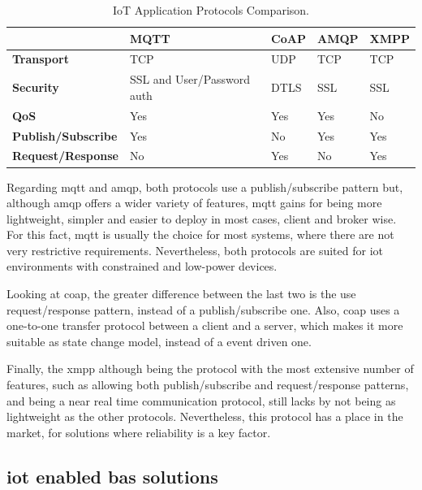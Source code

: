 \begin{table}[]
	\centering
	\begin{tabular}{|l|l|l|l|l|}
		\hline
		& \textbf{MQTT}              & \textbf{CoAP} & \textbf{AMQP} & \textbf{XMPP} \\ \hline
		\textbf{Transport}         & TCP                        & UDP           & TCP           & TCP           \\ \hline
		\textbf{Security}          & SSL and User/Password auth & DTLS          & SSL           & SSL           \\ \hline
		\textbf{QoS}               & Yes                        & Yes           & Yes           & No            \\ \hline
		\textbf{Publish/Subscribe} & Yes                        & No            & Yes           & Yes           \\ \hline
		\textbf{Request/Response}  & No                         & Yes           & No            & Yes           \\ \hline
	\end{tabular}
	\caption{IoT Application Protocols Comparison.}
	\label{iotapplayer}
\end{table}

Regarding \ac{mqtt} and \ac{amqp}, both protocols use a publish/subscribe pattern but, although \ac{amqp} offers a wider variety of features, \ac{mqtt} gains for being more lightweight, simpler and easier to deploy in most cases, client and broker wise. For this fact, \ac{mqtt} is usually the choice for most systems, where there are not very restrictive requirements. Nevertheless, both protocols are suited for \ac{iot} environments with constrained and low-power devices.

Looking at \ac{coap}, the greater difference between the last two is the use request/response pattern, instead of a publish/subscribe one. Also, \ac{coap} uses a one-to-one transfer protocol between a client and a server, which makes it more suitable as state change model, instead of a event driven one.

Finally, the \ac{xmpp} although being the protocol with the most extensive number of features, such as allowing both publish/subscribe and request/response patterns, and being a near real time communication protocol, still lacks by not being as lightweight as the other protocols. Nevertheless, this protocol has a place in the market, for solutions where reliability is a key factor.


\subsection{\ac{iot} enabled \ac{bas} solutions}

